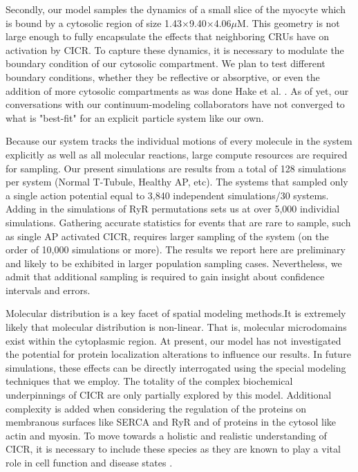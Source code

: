 \documentclass[12pt]{ucsddissertation}
\begin{document}
Secondly, our model samples the dynamics of a small slice of the myocyte which is bound by a cytosolic region of size 1.43$\times$9.40$\times$4.06$\mu$M. This geometry is not large enough to fully encapsulate the effects that neighboring CRUs have on activation by CICR. To capture these dynamics, it is necessary to modulate the boundary condition of our cytosolic compartment. We plan to test different boundary conditions, whether they be reflective or absorptive, or even the addition of more cytosolic compartments as was done Hake et al. \cite{Hake2012}. As of yet, our conversations with our continuum-modeling collaborators have not converged to what is "best-fit" for an explicit particle system like our own. 

Because our system tracks the individual motions of every molecule in the system explicitly as well as all molecular reactions, large compute resources are required for sampling. Our present simulations are results from a total of 128 simulations per system (Normal T-Tubule, Healthy AP, etc). The systems that sampled only a single action potential equal to 3,840 independent simulations/30 systems. Adding in the simulations of RyR permutations sets us at over 5,000 individial simulations. Gathering accurate statistics for events that are rare to sample, such as single AP activated CICR, requires larger sampling of the system (on the order of 10,000 simulations or more). The results we report here are preliminary and likely to be exhibited in larger population sampling cases. Nevertheless, we admit that additional sampling is required to gain insight about confidence intervals and errors. 

Molecular distribution is a key facet of spatial modeling methods.It is extremely likely that molecular distribution is non-linear. That is, molecular microdomains exist within the cytoplasmic region. At present, our model has not investigated the potential for protein localization alterations to influence our results. In future simulations, these effects can be directly interrogated using the special modeling techniques that we employ. The totality of the complex biochemical underpinnings of CICR are only partially explored by this model. Additional complexity is added when considering the regulation of the proteins on membranous surfaces like SERCA and RyR and of proteins in the cytosol like actin and myosin. To move towards a holistic and realistic understanding of CICR, it is necessary to include these species as they are known to play a vital role in cell function and disease states \cite{Ather2013}. 
\end{document}

